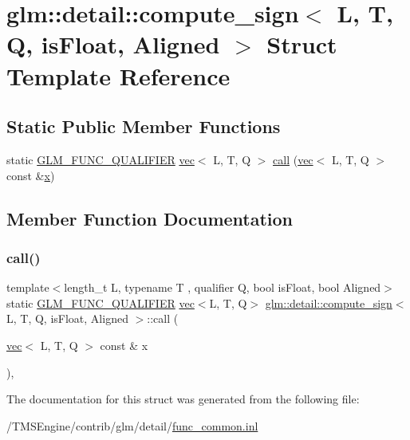 \hypertarget{structglm_1_1detail_1_1compute__sign}{}\section{glm\+:\+:detail\+:\+:compute\+\_\+sign$<$ L, T, Q, is\+Float, Aligned $>$ Struct Template Reference}
\label{structglm_1_1detail_1_1compute__sign}
\subsection*{Static Public Member Functions}
\begin{DoxyCompactItemize}
\item 
static \hyperlink{setup_8hpp_a33fdea6f91c5f834105f7415e2a64407}{G\+L\+M\+\_\+\+F\+U\+N\+C\+\_\+\+Q\+U\+A\+L\+I\+F\+I\+ER} \hyperlink{structglm_1_1vec}{vec}$<$ L, T, Q $>$ \hyperlink{structglm_1_1detail_1_1compute__sign_a92a52e249fc740dd128d3b3b09bd0653}{call} (\hyperlink{structglm_1_1vec}{vec}$<$ L, T, Q $>$ const \&\hyperlink{_s_d_l__opengl_8h_ad0e63d0edcdbd3d79554076bf309fd47}{x})
\end{DoxyCompactItemize}


\subsection{Member Function Documentation}
\mbox{\label{structglm_1_1detail_1_1compute__sign_a92a52e249fc740dd128d3b3b09bd0653}} 
\subsubsection{\texorpdfstring{call()}{call()}}
{\footnotesize\ttfamily template$<$length\+\_\+t L, typename T , qualifier Q, bool is\+Float, bool Aligned$>$ \\
static \hyperlink{setup_8hpp_a33fdea6f91c5f834105f7415e2a64407}{G\+L\+M\+\_\+\+F\+U\+N\+C\+\_\+\+Q\+U\+A\+L\+I\+F\+I\+ER} \hyperlink{structglm_1_1vec}{vec}$<$L, T, Q$>$ \hyperlink{structglm_1_1detail_1_1compute__sign}{glm\+::detail\+::compute\+\_\+sign}$<$ L, T, Q, is\+Float, Aligned $>$\+::call (\begin{DoxyParamCaption}\item[{\hyperlink{structglm_1_1vec}{vec}$<$ L, T, Q $>$ const \&}]{x }\end{DoxyParamCaption})\hspace{0.3cm}{\ttfamily [inline]}, {\ttfamily [static]}}



The documentation for this struct was generated from the following file\+:\begin{DoxyCompactItemize}
\item 
/\+T\+M\+S\+Engine/contrib/glm/detail/\hyperlink{func__common_8inl}{func\+\_\+common.\+inl}\end{DoxyCompactItemize}
